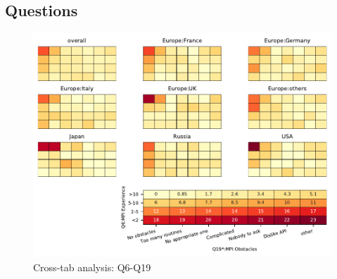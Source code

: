 
\subsection{Questions}


\begin{figure}
\begin{center}
\includegraphics[width=12cm]{../pdfs/Q6-Q19.pdf}
\caption{Cross-tab analysis: Q6-Q19}
\label{fig:Q6-Q19}
\end{center}
\end{figure}
